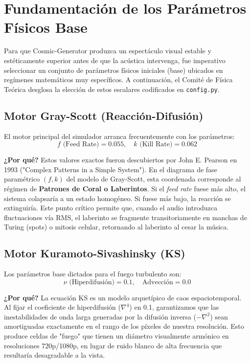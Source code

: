 \documentclass[12pt]{article}
\begin{document}
\section{Fundamentación de los Parámetros Físicos Base}

Para que Cosmic-Generator produzca un espectáculo visual estable y estéticamente superior antes de que la acústica intervenga, fue imperativo seleccionar un conjunto de parámetros físicos iniciales (base) ubicados en regímenes matemáticos muy específicos. A continuación, el Comité de Física Teórica desglosa la elección de estos escalares codificados en \texttt{config.py}.

\subsection{Motor Gray-Scott (Reacción-Difusión)}
El motor principal del simulador arranca frecuentemente con los parámetros:
\begin{equation}
f \text{ (Feed Rate)} = 0.055, \quad k \text{ (Kill Rate)} = 0.062
\end{equation}

\textbf{¿Por qué?} Estos valores exactos fueron descubiertos por John E. Pearson en 1993 ("Complex Patterns in a Simple System"). En el diagrama de fase paramétrico $(f, k)$ del modelo de Gray-Scott, esta coordenada corresponde al régimen de \textbf{Patrones de Coral o Laberintos}. 
Si el \textit{feed rate} fuese más alto, el sistema colapsaría a un estado homogéneo. Si fuese más bajo, la reacción se extinguiría. Este punto crítico permite que, cuando el audio introduzca fluctuaciones vía RMS, el laberinto se fragmente transitoriamente en manchas de Turing (spots) o mitosis celular, retornando al laberinto al cesar la música.

\subsection{Motor Kuramoto-Sivashinsky (KS)}
Los parámetros base dictados para el fuego turbulento son:
\begin{equation}
\nu \text{ (Hiperdifusión)} = 0.1, \quad \text{Advección} = 0.0
\end{equation}

\textbf{¿Por qué?} La ecuación KS es un modelo arquetípico de caos espaciotemporal. Al fijar el coeficiente de hiperdifusión ($\nabla^4$) en 0.1, garantizamos que las inestabilidades de onda larga generadas por la difusión inversa ($-\nabla^2$) sean amortiguadas exactamente en el rango de los píxeles de nuestra resolución. Esto produce celdas de "fuego" que tienen un diámetro visualmente armónico en resoluciones 720p/1080p, en lugar de ruido blanco de alta frecuencia que resultaría desagradable a la vista.
\end{document}

